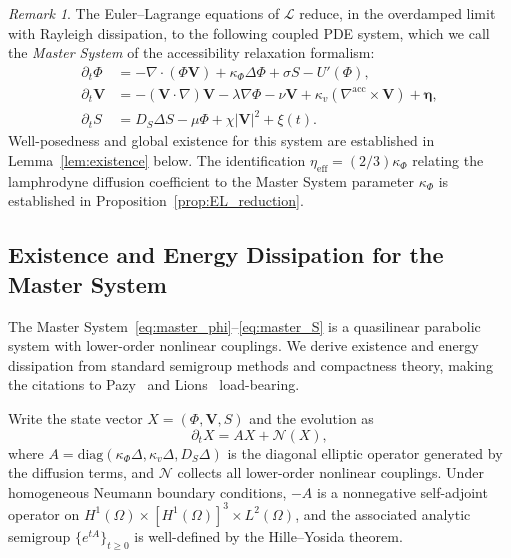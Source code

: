 \documentclass[12pt,a4paper]{article}
\theoremstyle{plain}
\theoremstyle{definition}
\theoremstyle{remark}
\newtheorem{remark}[theorem]{Remark}
\newcommand{\Lacc}{\mathcal{L}}
\newcommand{\nabacc}{\nabla^{\!\mathrm{acc}}}
\newcommand{\etaeff}{\eta_{\mathrm{eff}}}
\begin{document}
\begin{remark}
The Euler--Lagrange equations of $\Lacc$ reduce, in the overdamped limit with
Rayleigh dissipation, to the following coupled PDE system, which we call the
\emph{Master System} of the accessibility relaxation formalism:
\begin{align}
  \partial_t\Phi &= -\nabla\cdot(\Phi\mathbf{V}) + \kappa_\Phi\Delta\Phi
                    + \sigma S - U'(\Phi), \label{eq:master_phi} \\
  \partial_t\mathbf{V} &= -(\mathbf{V}\cdot\nabla)\mathbf{V}
                          - \lambda\nabla\Phi - \nu\mathbf{V}
                          + \kappa_v(\nabacc\times\mathbf{V}) + \bm{\eta},
                          \label{eq:master_V} \\
  \partial_t S &= D_S\Delta S - \mu\Phi + \chi|\mathbf{V}|^2 + \xi(t).
  \label{eq:master_S}
\end{align}
Well-posedness and global existence for this system are established in
Lemma~\ref{lem:existence} below. The identification $\etaeff = (2/3)\kappa_\Phi$
relating the lamphrodyne diffusion coefficient to the Master System parameter
$\kappa_\Phi$ is established in Proposition~\ref{prop:EL_reduction}.
\end{remark}

\subsection{Existence and Energy Dissipation for the Master System}
\label{subsec:wellposed}

The Master System~\eqref{eq:master_phi}--\eqref{eq:master_S} is a quasilinear
parabolic system with lower-order nonlinear couplings. We derive existence and
energy dissipation from standard semigroup methods and compactness theory, making
the citations to Pazy~\cite{Pazy1983} and Lions~\cite{Lions1969} load-bearing.

Write the state vector $X = (\Phi,\mathbf{V},S)$ and the evolution as
\begin{equation}
  \partial_t X = AX + \mathcal{N}(X),
  \label{eq:abstract_cauchy}
\end{equation}
where $A = \mathrm{diag}(\kappa_\Phi\Delta, \kappa_v\Delta, D_S\Delta)$ is the
diagonal elliptic operator generated by the diffusion terms, and $\mathcal{N}$
collects all lower-order nonlinear couplings. Under homogeneous Neumann boundary
conditions, $-A$ is a nonnegative self-adjoint operator on
$H^1(\Omega)\times[H^1(\Omega)]^3\times L^2(\Omega)$, and the associated analytic
semigroup $\{e^{tA}\}_{t\geq 0}$ is well-defined by the Hille--Yosida theorem.
\end{document}
